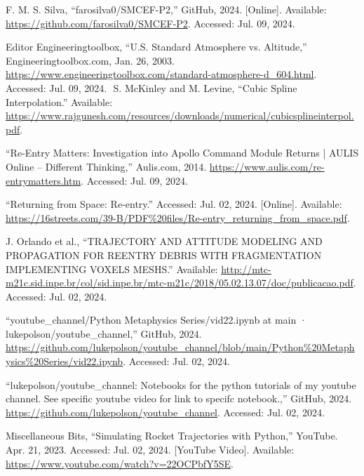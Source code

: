 \documentclass[runningheads]{llncs}
\begin{document}
\begin{thebibliography}{10}

F. M. S. Silva, ``farosilva0/SMCEF-P2,'' GitHub, 2024. [Online]. Available: \url{https://github.com/farosilva0/SMCEF-P2}. Accessed: Jul. 09, 2024.

Editor Engineeringtoolbox, “U.S. Standard Atmosphere vs. Altitude,” Engineeringtoolbox.com, Jan. 26, 2003. \url{https://www.engineeringtoolbox.com/standard-atmosphere-d\_604.html}. Accessed: Jul. 09, 2024.
‌
S. McKinley and M. Levine, “Cubic Spline Interpolation.” Available: \url{https://www.rajgunesh.com/resources/downloads/numerical/cubicsplineinterpol.pdf}.

“Re-Entry Matters: Investigation into Apollo Command Module Returns | AULIS Online – Different Thinking,” Aulis.com, 2014. \url{https://www.aulis.com/re-entrymatters.htm}. Accessed: Jul. 09, 2024.

“Returning from Space: Re-entry.” Accessed: Jul. 02, 2024. [Online]. Available: \url{https://16streets.com/39-B/PDF%20files/Re-entry\_returning_from_space.pdf}.

J. Orlando et al., “TRAJECTORY AND ATTITUDE MODELING AND PROPAGATION FOR REENTRY DEBRIS WITH FRAGMENTATION IMPLEMENTING VOXELS MESHS.” Available: \url{http://mtc-m21c.sid.inpe.br/col/sid.inpe.br/mtc-m21c/2018/05.02.13.07/doc/publicacao.pdf}. Accessed: Jul. 02, 2024.

“youtube\_channel/Python Metaphysics Series/vid22.ipynb at main · lukepolson/youtube\_channel,” GitHub, 2024. \url{https://github.com/lukepolson/youtube_channel/blob/main/Python%20Metaphysics%20Series/vid22.ipynb}. Accessed: Jul. 02, 2024.

“lukepolson/youtube\_channel: Notebooks for the python tutorials of my youtube channel. See specific youtube video for link to specifc notebook.,” GitHub, 2024. \url{https://github.com/lukepolson/youtube\_channel}. Accessed: Jul. 02, 2024.

Miscellaneous Bits, “Simulating Rocket Trajectories with Python,” YouTube. Apr. 21, 2023. Accessed: Jul. 02, 2024. [YouTube Video]. Available: \url{https://www.youtube.com/watch?v=22OCPbfY5SE}.


\end{thebibliography}
\end{document}
